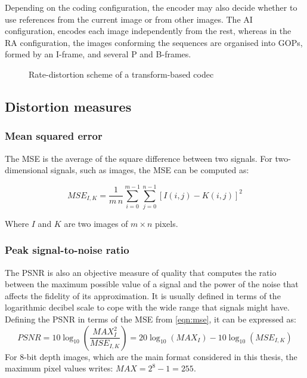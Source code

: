 \documentclass[11pt,a4paper,openright,twoside]{book}
\numberwithin{equation}{section} %
\numberwithin{figure}{section} %
\numberwithin{table}{section} %
\begin{document}
Depending on the coding configuration, the encoder may also decide whether to
use references from the current image or from other images.
The \ac{AI} configuration, encodes each image independently from the rest,
whereas in the \ac{RA} configuration, the images conforming the sequences are
organised into \acp{GOP}, formed by an I-frame, and several P and B-frames.

\begin{figure}[tb]
	\centering
	
	\caption{Rate-distortion scheme of a transform-based codec}
	\label{fig:rate_distortion_scheme}
\end{figure}

\subsection{Distortion measures}
\label{sub:distortion_measures}

\subsubsection{Mean squared error}
\label{ssub:mean_squared_error}

The \ac{MSE} is the average of the square difference between two
signals.
For two-dimensional signals, such as images, the \ac{MSE} can be computed as:

\begin{equation}
	MSE_{I,K} = \frac{1}{m\,n} \sum\limits_{i=0}^{m-1} \sum\limits_{j=0}^{n-1}
	{\left[ I(i,j) - K(i,j) \right]} ^2
	\label{eqn:mse}
\end{equation}

Where $I$ and $K$ are two images of $m \times n$ pixels.

\subsubsection{Peak signal-to-noise ratio}
\label{ssub:peak_signal_to_noise_ratio}

The \ac{PSNR} is also an objective measure of quality that computes the ratio
between the maximum possible value of a signal and the power of the noise that
affects the fidelity of its approximation.
It is usually defined in terms of the logarithmic decibel scale to cope
with the wide range that signals might have.
Defining the \ac{PSNR} in terms of the \ac{MSE} from
\eqref{eqn:mse}, it can be expressed as:
\begin{equation}
	PSNR = 10 \log_{10} \left(\frac{MAX_I^2}{MSE_{I,K}}\right)
	= 20 \log_{10} (MAX_I) - 10 \log_{10} (MSE_{I,K})
	\label{eqn:psnr}
\end{equation}
For 8-bit depth images, which are the main format considered in this thesis,
the maximum pixel values writes: $MAX = 2^{8} - 1 = 255$.
\end{document}
